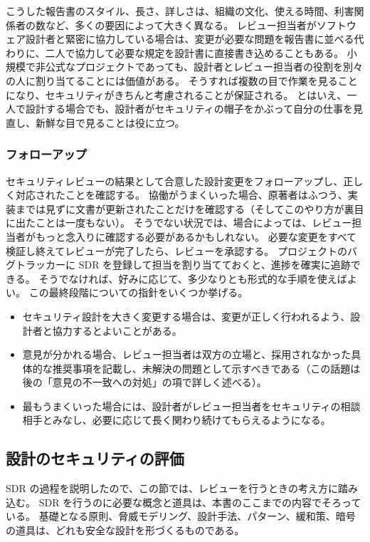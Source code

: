 \documentclass[uplatex]{jsarticle}
\begin{document}
こうした報告書のスタイル、長さ、詳しさは、組織の文化、使える時間、利害関係者の数など、多くの要因によって大きく異なる。
レビュー担当者がソフトウェア設計者と緊密に協力している場合は、変更が必要な問題を報告書に並べる代わりに、二人で協力して必要な規定を設計書に直接書き込めることもある。
小規模で非公式なプロジェクトであっても、設計者とレビュー担当者の役割を別々の人に割り当てることには価値がある。
そうすれば複数の目で作業を見ることになり、セキュリティがきちんと考慮されることが保証される。
とはいえ、一人で設計する場合でも、設計者がセキュリティの帽子をかぶって自分の仕事を見直し、新鮮な目で見ることは役に立つ。

\subsubsection{フォローアップ}

セキュリティレビューの結果として合意した設計変更をフォローアップし、正しく対応されたことを確認する。
協働がうまくいった場合、原著者はふつう、実装までは見ずに文書が更新されたことだけを確認する（そしてこのやり方が裏目に出たことは一度もない）。
そうでない状況では、場合によっては、レビュー担当者がもっと念入りに確認する必要があるかもしれない。
必要な変更をすべて検証し終えてレビューが完了したら、レビューを承認する。
プロジェクトのバグトラッカーに SDR を登録して担当を割り当てておくと、進捗を確実に追跡できる。
そうでなければ、好みに応じて、多少なりとも形式的な手順を使えばよい。
この最終段階についての指針をいくつか挙げる。
\begin{itemize}
\item セキュリティ設計を大きく変更する場合は、変更が正しく行われるよう、設計者と協力するとよいことがある。
\item 意見が分かれる場合、レビュー担当者は双方の立場と、採用されなかった具体的な推奨事項を記載し、未解決の問題として示すべきである（この話題は後の「意見の不一致への対処」の項で詳しく述べる）。
\item 最もうまくいった場合には、設計者がレビュー担当者をセキュリティの相談相手とみなし、必要に応じて長く関わり続けてもらえるようになる。
\end{itemize}

\subsection{設計のセキュリティの評価}

SDR の過程を説明したので、この節では、レビューを行うときの考え方に踏み込む。
SDR を行うのに必要な概念と道具は、本書のここまでの内容でそろっている。
基礎となる原則、脅威モデリング、設計手法、パターン、緩和策、暗号の道具は、どれも安全な設計を形づくるものである。
\end{document}
